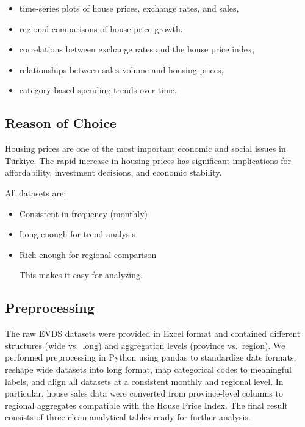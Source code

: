 \documentclass[
  11pt,
  a4paper,
]{article}
\providecommand{\tightlist}{%
  \setlength{\itemsep}{0pt}\setlength{\parskip}{0pt}}
\begin{document}
\begin{itemize}
\tightlist
\item
  time-series plots of house prices, exchange rates, and sales,
\item
  regional comparisons of house price growth,
\item
  correlations between exchange rates and the house price index,
\item
  relationships between sales volume and housing prices,
\item
  category-based spending trends over time,
\end{itemize}

\subsection{Reason of Choice}\label{reason-of-choice}

Housing prices are one of the most important economic and social issues
in Türkiye. The rapid increase in housing prices has significant
implications for affordability, investment decisions, and economic
stability.

All datasets are:

\begin{itemize}
\item
  Consistent in frequency (monthly)
\item
  Long enough for trend analysis
\item
  Rich enough for regional comparison

  This makes it easy for analyzing.
\end{itemize}

\subsection{Preprocessing}\label{preprocessing}

The raw EVDS datasets were provided in Excel format and contained
different structures (wide vs.~long) and aggregation levels (province
vs.~region). We performed preprocessing in Python using pandas to
standardize date formats, reshape wide datasets into long format, map
categorical codes to meaningful labels, and align all datasets at a
consistent monthly and regional level. In particular, house sales data
were converted from province-level columns to regional aggregates
compatible with the House Price Index. The final result consists of
three clean analytical tables ready for further analysis.
\end{document}
